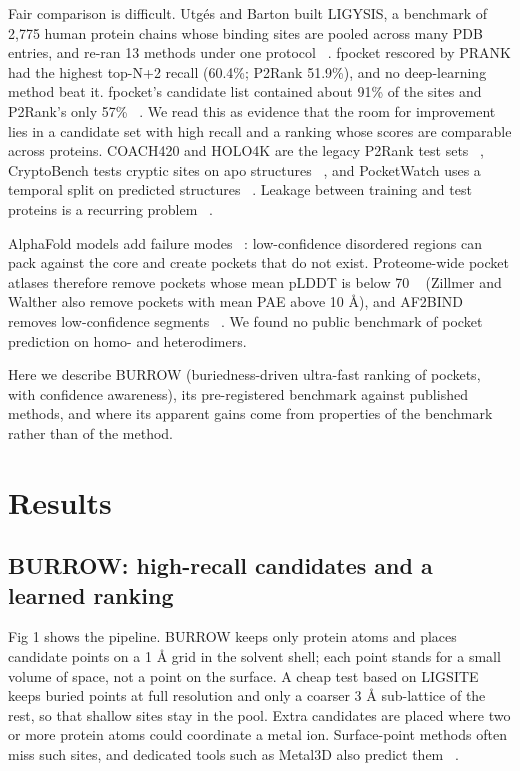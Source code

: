 \documentclass[10pt,letterpaper]{article}
\begin{document}
Fair comparison is difficult. Utgés and Barton built LIGYSIS, a benchmark of 2,775 human protein chains whose binding sites are pooled across many PDB entries, and re-ran 13 methods under one protocol ~\cite{utges2024}. fpocket rescored by PRANK had the highest top-N+2 recall (60.4\%; P2Rank 51.9\%), and no deep-learning method beat it. fpocket's candidate list contained about 91\% of the sites and P2Rank's only 57\% ~\cite{utges2024}. We read this as evidence that the room for improvement lies in a candidate set with high recall and a ranking whose scores are comparable across proteins. COACH420 and HOLO4K are the legacy P2Rank test sets ~\cite{krivak2018,yang2013,schmidtke2010}, CryptoBench tests cryptic sites on apo structures ~\cite{skrhak2025}, and PocketWatch uses a temporal split on predicted structures ~\cite{portnoi2026}. Leakage between training and test proteins is a recurring problem ~\cite{skrhak2025,portnoi2026,durairaj2024}.

AlphaFold models add failure modes ~\cite{jumper2021,varadi2022}: low-confidence disordered regions can pack against the core and create pockets that do not exist. Proteome-wide pocket atlases therefore remove pockets whose mean pLDDT is below 70 ~\cite{carpenter2025,zillmer2025} (Zillmer and Walther also remove pockets with mean PAE above 10 \AA{}), and AF2BIND removes low-confidence segments ~\cite{gazizov2026}. We found no public benchmark of pocket prediction on homo- and heterodimers.

Here we describe BURROW (buriedness-driven ultra-fast ranking of pockets, with confidence awareness), its pre-registered benchmark against published methods, and where its apparent gains come from properties of the benchmark rather than of the method.

\section*{Results}

\subsection*{BURROW: high-recall candidates and a learned ranking}

Fig 1 shows the pipeline. BURROW keeps only protein atoms and places candidate points on a 1 \AA{} grid in the solvent shell; each point stands for a small volume of space, not a point on the surface. A cheap test based on LIGSITE ~\cite{hendlich1997} keeps buried points at full resolution and only a coarser 3 \AA{} sub-lattice of the rest, so that shallow sites stay in the pool. Extra candidates are placed where two or more protein atoms could coordinate a metal ion. Surface-point methods often miss such sites, and dedicated tools such as Metal3D also predict them ~\cite{durr2023}.
\end{document}
